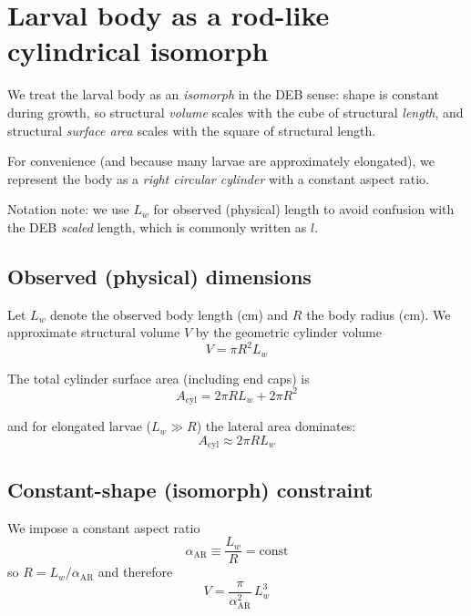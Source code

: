 \documentclass[11pt]{article}
\begin{document}
\section{Larval body as a rod-like cylindrical isomorph}
\label{app:rod}

We treat the larval body as an \emph{isomorph} in the DEB sense: shape is constant during growth, so structural \emph{volume} scales with the cube of structural \emph{length}, and structural \emph{surface area} scales with the square of structural length.

For convenience (and because many larvae are approximately elongated), we represent the body as a \emph{right circular cylinder} with a constant aspect ratio.

Notation note: we use $L_w$ for observed (physical) length to avoid confusion with the DEB \emph{scaled} length, which is commonly written as $l$.

\subsection*{Observed (physical) dimensions}

Let $L_w$ denote the observed body length (cm) and $R$ the body radius (cm). We approximate structural volume $V$ by the geometric cylinder volume
\begin{equation}
  V = \pi R^2 L_w
\end{equation}

The total cylinder surface area (including end caps) is
\begin{equation}
  A_{\mathrm{cyl}} = 2\pi R L_w + 2\pi R^2
\end{equation}

and for elongated larvae ($L_w \gg R$) the lateral area dominates:
\begin{equation}
  A_{\mathrm{cyl}} \approx 2\pi R L_w
\end{equation}

\subsection*{Constant-shape (isomorph) constraint}

We impose a constant aspect ratio
\begin{equation}
  \alpha_{\mathrm{AR}} \equiv \frac{L_w}{R} = \mathrm{const}
\end{equation}
so $R = L_w/\alpha_{\mathrm{AR}}$ and therefore
\begin{equation}
  V = \frac{\pi}{\alpha_{\mathrm{AR}}^2}\,L_w^3
\end{equation}
\end{document}
